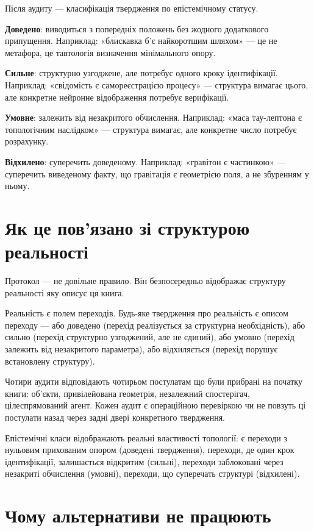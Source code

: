 \documentclass[12pt, a4paper, openany]{book}
\begin{document}
Після аудиту — класифікація твердження по епістемічному статусу.

\textbf{Доведено}: виводиться з попередніх положень без жодного додаткового припущення. Наприклад: «блискавка б'є найкоротшим шляхом» — це не метафора, це тавтологія визначення мінімального опору.

\textbf{Сильне}: структурно узгоджене, але потребує одного кроку ідентифікації. Наприклад: «свідомість є самореєстрацією процесу» — структура вимагає цього, але конкретне нейронне відображення потребує верифікації.

\textbf{Умовне}: залежить від незакритого обчислення. Наприклад: «маса тау-лептона є топологічним наслідком» — структура вимагає, але конкретне число потребує розрахунку.

\textbf{Відхилено}: суперечить доведеному. Наприклад: «гравітон є частинкою» — суперечить виведеному факту, що гравітація є геометрією поля, а не збуренням у ньому.

\section{Як це пов'язано зі структурою реальності}

Протокол — не довільне правило. Він безпосередньо відображає структуру реальності яку описує ця книга.

Реальність є полем переходів. Будь-яке твердження про реальність є описом переходу — або доведено (перехід реалізується за структурна необхідність), або сильно (перехід структурно узгоджений, але не єдиний), або умовно (перехід залежить від незакритого параметра), або відхиляється (перехід порушує встановлену структуру).

Чотири аудити відповідають чотирьом постулатам що були прибрані на початку книги: об'єкти, привілейована геометрія, незалежний спостерігач, цілеспрямований агент. Кожен аудит є операційною перевіркою чи не повзуть ці постулати назад через задні двері конкретного твердження.

Епістемічні класи відображають реальні властивості топології: є переходи з нульовим прихованим опором (доведені твердження), переходи, де один крок ідентифікації, залишається відкритим (сильні), переходи заблоковані через незакриті обчислення (умовні), переходи, що суперечать структурі (відхилені).

\section{Чому альтернативи не працюють}
\end{document}

